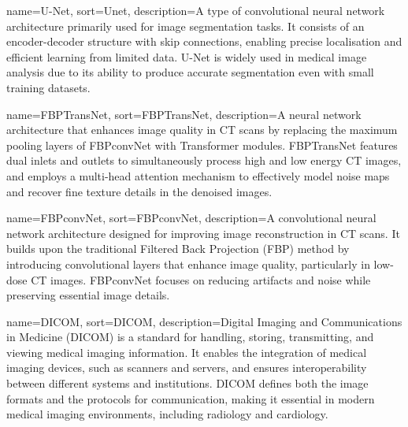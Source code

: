 {
    name={U-Net},
    sort=Unet,
    description={A type of convolutional neural network architecture primarily used for image segmentation tasks. It consists of an encoder-decoder structure with skip connections, enabling precise localisation and efficient learning from limited data. U-Net is widely used in medical image analysis due to its ability to produce accurate segmentation even with small training datasets.}
}

{
    name={FBPTransNet},
    sort=FBPTransNet,
    description={A neural network architecture that enhances image quality in CT scans by replacing the maximum pooling layers of FBPconvNet with Transformer modules. FBPTransNet features dual inlets and outlets to simultaneously process high and low energy CT images, and employs a multi-head attention mechanism to effectively model noise maps and recover fine texture details in the denoised images.}
}

{
    name={FBPconvNet},
    sort=FBPconvNet,
    description={A convolutional neural network architecture designed for improving image reconstruction in CT scans. It builds upon the traditional Filtered Back Projection (FBP) method by introducing convolutional layers that enhance image quality, particularly in low-dose CT images. FBPconvNet focuses on reducing artifacts and noise while preserving essential image details.}
}

{
    name={DICOM},
    sort=DICOM,
    description={Digital Imaging and Communications in Medicine (DICOM) is a standard for handling, storing, transmitting, and viewing medical imaging information. It enables the integration of medical imaging devices, such as scanners and servers, and ensures interoperability between different systems and institutions. DICOM defines both the image formats and the protocols for communication, making it essential in modern medical imaging environments, including radiology and cardiology.}
}



